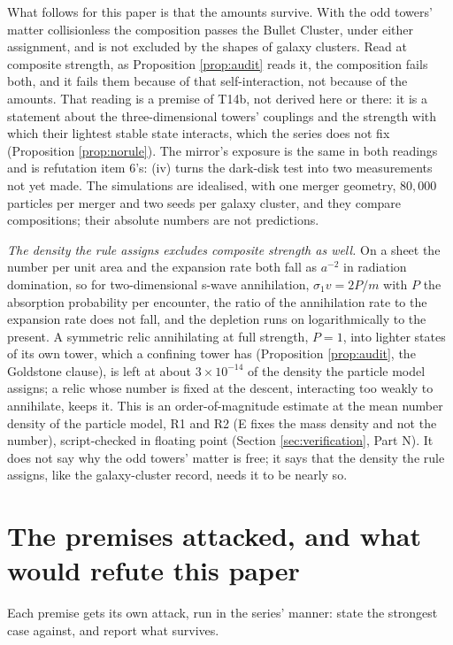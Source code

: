 \documentclass[11pt]{article}
\theoremstyle{definition}
\let\oldsection\section
\renewcommand{\section}{\clearpage\oldsection}   %
\begin{document}
What follows for this paper is that the amounts survive. With the odd towers' matter collisionless the composition passes the Bullet Cluster, under either assignment, and is not excluded by the shapes of galaxy clusters. Read at composite strength, as Proposition \ref{prop:audit} reads it, the composition fails both, and it fails them because of that self-interaction, not because of the amounts. That reading is a premise of T14b, not derived here or there: it is a statement about the three-dimensional towers' couplings and the strength with which their lightest stable state interacts, which the series does not fix (Proposition \ref{prop:norule}). The mirror's exposure is the same in both readings and is refutation item 6's: (iv) turns the dark-disk test into two measurements not yet made. The simulations are idealised, with one merger geometry, $80{,}000$ particles per merger and two seeds per galaxy cluster, and they compare compositions; their absolute numbers are not predictions.

\emph{The density the rule assigns excludes composite strength as well.} On a sheet the number per unit area and the expansion rate both fall as $a^{-2}$ in radiation domination, so for two-dimensional s-wave annihilation, $\sigma_{1}v = 2P/m$ with $P$ the absorption probability per encounter, the ratio of the annihilation rate to the expansion rate does not fall, and the depletion runs on logarithmically to the present. A symmetric relic annihilating at full strength, $P = 1$, into lighter states of its own tower, which a confining tower has (Proposition \ref{prop:audit}, the Goldstone clause), is left at about $3 \times 10^{-14}$ of the density the particle model assigns; a relic whose number is fixed at the descent, interacting too weakly to annihilate, keeps it. This is an order-of-magnitude estimate at the mean number density of the particle model, R1 and R2 (E fixes the mass density and not the number), script-checked in floating point (Section \ref{sec:verification}, Part N). It does not say why the odd towers' matter is free; it says that the density the rule assigns, like the galaxy-cluster record, needs it to be nearly so.

\section{The premises attacked, and what would refute this paper}\label{sec:premises}

Each premise gets its own attack, run in the series' manner: state the strongest case against, and report what survives.
\end{document}

